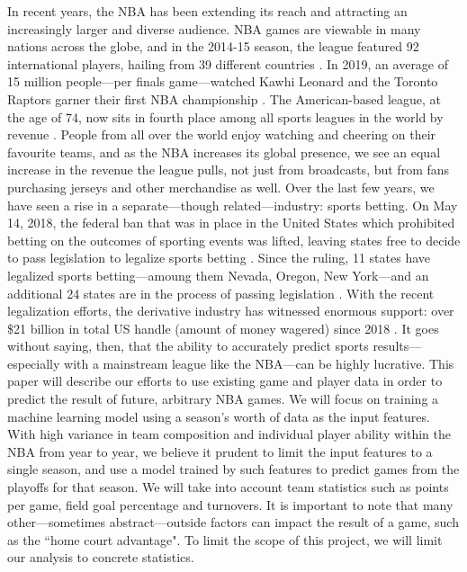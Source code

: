 \documentclass[letterpaper]{article} %
\begin{document}
In recent years, the NBA has been extending its reach and attracting an increasingly larger and diverse audience. NBA games are viewable in many nations across the globe, and in the 2014-15 season, the league featured 92 international players, hailing from 39 different countries \cite{jones2016predicting}. In 2019, an average of 15 million people---per finals game---watched Kawhi Leonard and the Toronto Raptors garner their first NBA championship \cite{gough_2019}. The American-based league, at the age of 74, now sits in fourth place among all sports leagues in the world by revenue \cite{amoros_2016}. People from all over the world enjoy watching and cheering on their favourite teams, and as the NBA increases its global presence, we see an equal increase in the revenue the league pulls, not just from broadcasts, but from fans purchasing jerseys and other merchandise as well. Over the last few years, we have seen a rise in a separate---though related---industry: sports betting. On May 14, 2018, the federal ban that was in place in the United States which prohibited betting on the outcomes of sporting events was lifted, leaving states free to decide to pass legislation to legalize sports betting \cite{licata_2019}. Since the ruling, 11 states have legalized sports betting---amoung them Nevada, Oregon, New York---and an additional 24 states are in the process of passing legislation \cite{licata_2019}. With the recent legalization efforts, the derivative industry has witnessed enormous support: over \$21 billion in total US handle (amount of money wagered) since 2018 \cite{legal_sports_report}. It goes without saying, then, that the ability to accurately predict sports results---especially with a mainstream league like the NBA---can be highly lucrative. This paper will describe our efforts to use existing game and player data in order to predict the result of future, arbitrary NBA games. We will focus on training a machine learning model using a season's worth of data as the input features. With high variance in team composition and individual player ability within the NBA from year to year, we believe it prudent to limit the input features to a single season, and use a model trained by such features to predict games from the playoffs for that season. We will take into account team statistics such as points per game, field goal percentage and turnovers. It is important to note that many other---sometimes abstract---outside factors can impact the result of a game, such as the ``home court advantage". To limit the scope of this project, we will limit our analysis to concrete statistics. \\
\end{document}
